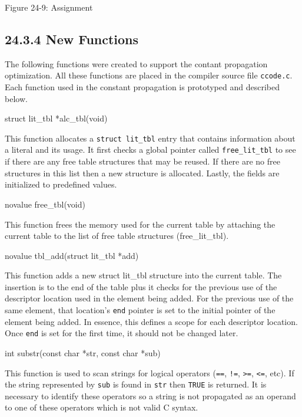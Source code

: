\bigskip

{\centering{}
Figure 24-9: Assignment
\par}

\subsection[24.3.4 New Functions]{24.3.4 New Functions}

The following functions were created to support the contant
propagation optimization. All these functions are placed in the
compiler source file \texttt{ccode.c}. Each function used in the
constant propagation is prototyped and described below.

{\ttfamily\mdseries
struct lit\_tbl *alc\_tbl(void)}


This function allocates a \texttt{struct lit\_tbl} entry that contains
information about a literal and its usage. It first checks a global
pointer called \texttt{free\_lit\_tbl} to see if there are any free
table structures that may be reused. If there are no free structures
in this list then a new structure is allocated. Lastly, the fields are
initialized to predefined values.

{\ttfamily\mdseries
novalue free\_tbl(void)}


This function frees the memory used for the current table by attaching
the current table to the list of free table structures
(free\_lit\_tbl).

{\ttfamily\mdseries
novalue tbl\_add(struct lit\_tbl *add)}


This function adds a new struct lit\_tbl structure into the current
table. The insertion is to the end of the table plus it checks for the
previous use of the descriptor location used in the element being
added. For the previous use of the same element, that location's
\texttt{end} pointer is set to the initial pointer of the element
being added. In essence, this defines a scope for each descriptor
location. Once \texttt{end} is set for the first time, it should not
be changed later.

{\ttfamily\mdseries
int substr(const char *str, const char *sub)}


This function is used to scan strings for logical operators
(\texttt{==}, \texttt{!=}, \texttt{{\textgreater}=},
\texttt{{\textless}=}, etc). If the string represented by \texttt{sub}
is found in \texttt{str} then \texttt{TRUE} is returned. It is
necessary to identify these operators so a string is not propagated as
an operand to one of these operators which is not valid C syntax.

